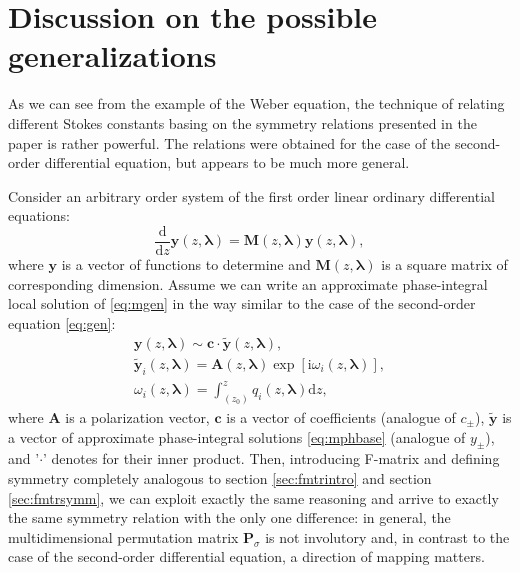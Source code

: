 \documentclass[atmp]{ipart_v1}
\def\rmd{\mathrm{d}}
\def\rmi{\mathrm{i}}
\def\lmbd{\bm{\lambda}}
\def\P{\bm{P}_\sigma}
\def\w{\omega}
\newcommand\eref[1]{\eqref{#1}}
\newcommand\sref[1]{section \ref{#1}}
\begin{document}
\section{Discussion on the possible generalizations \label{sec:discuss}}

As we can see from the example of the Weber equation, the technique of relating different 
Stokes constants basing on the symmetry relations presented in the paper is rather powerful. 
The relations were obtained for the case of the second-order differential equation, 
but appears to be much more general.

Consider an arbitrary order system of the first order linear ordinary differential equations:
\begin{equation}
\frac{\rmd}{\rmd z} \bm{y}(z,\lmbd) = \bm{M}(z,\lmbd) \bm{y}(z,\lmbd),
\label{eq:mgen}
\end{equation}
where $\bm{y}$ is a vector of functions to determine and $\bm{M}(z,\lmbd)$ is a square matrix of corresponding dimension.
Assume we can write an approximate phase-integral local solution of \eref{eq:mgen} in the way
similar to the case of the second-order equation \eref{eq:gen}:
\begin{subequations}
\label{eq:mphsint}
\begin{eqnarray}
\bm{y}(z,\lmbd) \sim \bm{c} \cdot \bm{\tilde{y}}(z,\lmbd), \label{eq:mgensol}
\\
\bm{\tilde{y}}_i(z,\lmbd) = \bm{A}(z,\lmbd) \exp [\rmi \w_i(z,\lmbd)], \label{eq:mphbase}
\\
\w_i(z,\lmbd)=\int_{(z_0)}^z q_i(z,\lmbd) \rmd z, \label{eq:mphase}
\end{eqnarray}
\end{subequations}
where $\bm{A}$ is a polarization vector, $\bm{c}$ is a vector of coefficients (analogue of $c_\pm$), 
$\bm{\tilde{y}}$ is a vector of approximate phase-integral solutions \eref{eq:mphbase} (analogue of $y_\pm$), 
and '$\cdot$' denotes for their inner product.
Then, introducing F-matrix and defining symmetry completely analogous to \sref{sec:fmtrintro} and \sref{sec:fmtrsymm},
we can exploit exactly the same reasoning and arrive to exactly the same symmetry relation with the only one difference:
in general, the multidimensional permutation matrix $\P$ is not involutory and, in contrast to the case of
the second-order differential equation, a direction of mapping matters.
\end{document}
